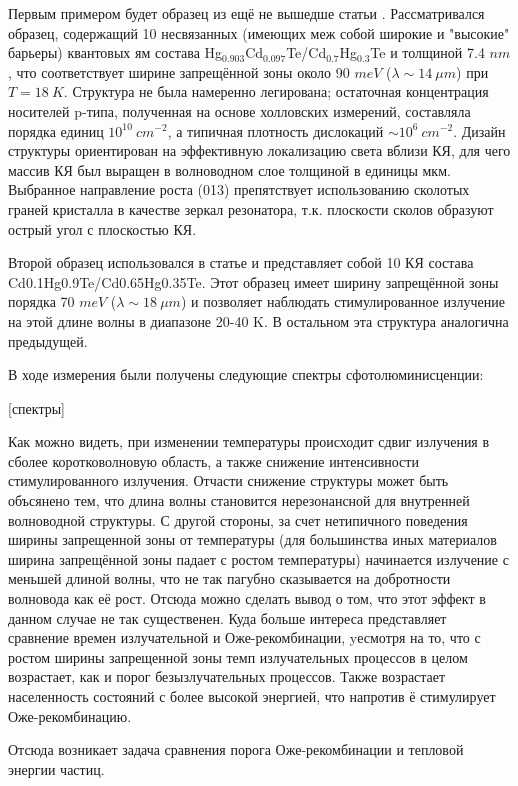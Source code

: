 \documentclass[../main.tex]{subfiles}
\begin{document}
    Первым примером будет образец из ещё не вышедше статьи \cite{Utochkin}. Рассматривался образец, содержащий 10 несвязанных
    (имеющих меж собой широкие и "высокие" барьеры) квантовых ям
    состава Hg${}_{0.903}$Cd${}_{0.097}$Te/Cd${}_0.7$Hg${}_{0.3}$Te и толщиной 7.4 $nm$, что соответствует ширине 
    запрещённой зоны около 90 $meV$ ($\lambda \sim 14~\mu m$) при $T = 18 ~K$. Структура не была намеренно легирована; остаточная концентрация 
    носителей p-типа, полученная на основе холловских измерений, составляла порядка единиц $10^10~cm^{-2}$, а типичная 
    плотность дислокаций $\sim 10^6~cm^{-2}$. Дизайн структуры ориентирован на эффективную локализацию света вблизи КЯ, для 
    чего массив КЯ был выращен в волноводном слое толщиной в единицы мкм. Выбранное направление роста (013) 
    препятствует использованию сколотых граней кристалла в качестве зеркал резонатора, т.к. плоскости сколов образуют
    острый угол с плоскостью КЯ.

    Второй образец использовался в статье \cite{Fadeev} и представляет собой 10 КЯ состава Cd0.1Hg0.9Te/Cd0.65Hg0.35Te.
    Этот образец имеет ширину запрещённой зоны порядка 70 $meV$ ($\lambda \sim 18~\mu m$) и позволяет наблюдать стимулированное 
    излучение на этой длине волны в диапазоне  20-40 K. В остальном эта структура аналогична предыдущей.

    В ходе измерения были получены следующие спектры сфотолюминисценции:

    [спектры]

    Как можно видеть, при изменении температуры происходит сдвиг излучения в сболее коротковолновую область, а также снижение 
    интенсивности стимулированного излучения. Отчасти снижение структуры может быть объсянено тем, что длина волны становится 
    нерезонансной для внутренней волноводной структуры. С другой стороны, за счет нетипичного поведения ширины запрещенной 
    зоны от температуры (для большинства иных материалов ширина запрещённой зоны падает с ростом температуры) начинается излучение
    с меньшей длиной волны, что не так пагубно сказывается на добротности волновода как её рост. Отсюда можно сделать вывод о том, 
    что этот эффект в данном случае не так существенен. Куда больше интереса представляет сравнение времен излучательной и 
    Оже-рекомбинации, yесмотря на то, что с ростом ширины запрещенной зоны темп излучательных процессов в целом возрастает, 
    как и порог безызлучательных процессов. Также возрастает населенность состояний с более высокой энергией, что напротив ё
    стимулирует Оже-рекомбинацию.

    Отсюда возникает задача сравнения порога Оже-рекомбинации и тепловой энергии частиц.
    \newpage
\end{document}

